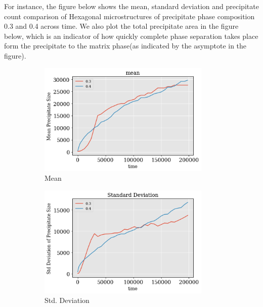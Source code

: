 \documentclass[12pt, a4paper]{report}
\begin{document}
For instance, the figure below shows the mean, standard deviation and precipitate count comparison of Hexagonal microstructures of precipitate phase composition 0.3 and 0.4 across time. We also plot the total precipitate area in the figure below, which is an indicator of how quickly complete phase separation takes place form the precipitate to the matrix phase(as indicated by the asymptote in the figure).

\begin{figure}[H]
\centering
\begin{subfigure}{.45\textwidth}
  \centering
  \includegraphics[width=0.9\textwidth]{Pictures/MSFeatures/mean_size.png}
  \caption{Mean}
  \label{img:microstrImg}
\end{subfigure}
\begin{subfigure}{.45\textwidth}
  \centering
  \includegraphics[width=0.9\textwidth]{Pictures/MSFeatures/std_size.png}
  \caption{Std. Deviation}
  \label{img:microstrImg}
\end{subfigure}
\begin{subfigure}{.45\textwidth}

\end{subfigure}
\end{figure}
\end{document}
